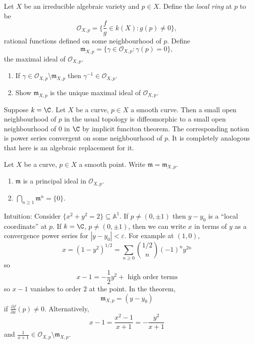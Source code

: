 \documentclass[a4paper]{article}
\renewcommand{\A}{\mathbb{A}}
\begin{document}
\begin{definition}
  Let \(X\) be an irreducible algebraic variety and \(p \in X\). Define the \emph{local ring} at \(p\) to be
  \[
    \mathcal O_{X, p} = \{\frac{f}{g} \in k(X): g(p) \neq 0\},
  \]
  rational functions defined on some neighbourhood of \(p\). Define
  \[
    \mathfrak m_{X, p} = \{\gamma \in \mathcal O_{X, p}: \gamma(p) = 0\},
  \]
  the maximal ideal of \(\mathcal O_{X, p}\).
\end{definition}

\begin{ex}\leavevmode
  \begin{enumerate}
  \item If \(\gamma \in \mathcal O_{X, p} \setminus \mathfrak m_{X, p}\) then \(\gamma^{-1} \in \mathcal O_{X, p}\).
  \item Show \(\mathfrak m_{X, p}\) is the unique maximal ideal of \(\mathcal O_{X, p}\).
  \end{enumerate}
\end{ex}

Suppose \(k = \C\). Let \(X\) be a curve, \(p \in X\) a smooth curve. Then a small open neighbourhood of \(p\) in the usual topology is diffeomorphic to a small open neighbourhood of \(0\) in \(\C\) by implicit funciton theorem. The corresponding notion is power series convergent on some neighbourhood of \(p\). It is completely analogous that here is an algebraic replacement for it.

\begin{theorem}
  Let \(X\) be a curve, \(p \in X\) a smooth point. Write \(\mathfrak m = \mathfrak m_{X, p}\).
  \begin{enumerate}
  \item \(\mathfrak m\) is a principal ideal in \(\mathcal O_{X, p}\).
  \item \(\bigcap_{n \geq 1} \mathfrak m^n = \{0\}\).
  \end{enumerate}
\end{theorem}

\begin{eg}
  Intuition: Consider \(\{x^2 + y^2 = 2\} \subseteq \A^1\). If \(p \neq (0, \pm 1)\) then \(y - y_0\) is a ``local coordinate'' at \(p\). If \(k = \C\), \(p \neq (0, \pm 1)\), then we can write \(x\) in terms of \(y\) as a convergence power series for \(|y - y_0| < \varepsilon\). For example at \((1, 0)\),
  \[
    x
    = (1 - y^2)^{1/2}
    = \sum_{n \geq 0} \binom{1/2}{n} (-1)^n y^{2n}
  \]
  so
  \[
    x - 1 = -\frac{1}{2}y^2 + \text{ high order terms}
  \]
  so \(x - 1\) vanishes to order \(2\) at the point. In the theorem,
  \[
    \mathfrak m_{X, p} = (y - y_0)
  \]
  if \(\frac{\partial f}{\partial x}(p) \neq 0\). Alternatively,
  \[
    x - 1
    = \frac{x^2 - 1}{x + 1}
    = -\frac{y^2}{x + 1}
  \]
  and \(\frac{1}{x + 1} \in \mathcal O_{X, p} \setminus \mathfrak m_{X, p}\).
\end{eg}
\end{document}
